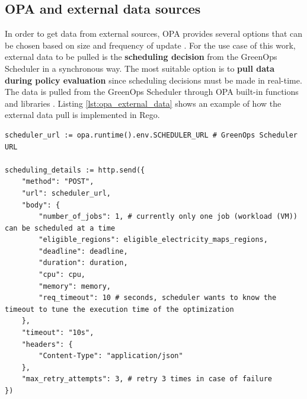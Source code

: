 \subsection{OPA and external data sources}
\label{sec:opa_external_data}

In order to get data from external sources, OPA provides several options that can be chosen based on size and frequency of update \cite{opa_external_data}.
For the use case of this work, external data to be pulled is the \textbf{scheduling decision} from the GreenOps Scheduler in a synchronous way.
The most suitable option is to \textbf{pull data during policy evaluation} since scheduling decisions must be made in real-time.
The data is pulled from the GreenOps Scheduler through OPA built-in functions and libraries \cite{opa_external_data}.
Listing \ref{lst:opa_external_data} shows an example of how the external data pull is implemented in Rego.

%

\vspace{3.0cm}
\begin{lstlisting}[language=rego, caption={OPA external data pull}, label={lst:opa_external_data}]
scheduler_url := opa.runtime().env.SCHEDULER_URL # GreenOps Scheduler URL

scheduling_details := http.send({
	"method": "POST",
	"url": scheduler_url,
	"body": {
		"number_of_jobs": 1, # currently only one job (workload (VM)) can be scheduled at a time
		"eligible_regions": eligible_electricity_maps_regions,
		"deadline": deadline,
		"duration": duration, 
		"cpu": cpu,
		"memory": memory,
		"req_timeout": 10 # seconds, scheduler wants to know the timeout to tune the execution time of the optimization
	},
	"timeout": "10s",
	"headers": {
		"Content-Type": "application/json"
	},
	"max_retry_attempts": 3, # retry 3 times in case of failure
})
\end{lstlisting}

